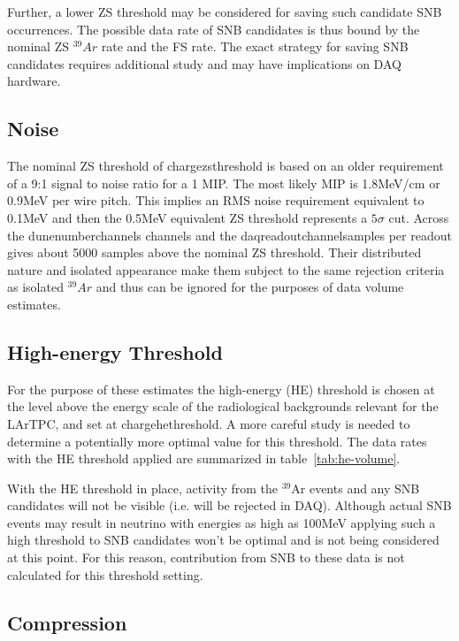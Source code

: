 Further, a lower ZS threshold may be considered for saving such
candidate SNB occurrences.
The possible data rate of SNB candidates is thus bound by the nominal
ZS $^{39}Ar$ rate and the FS rate.
The exact strategy for saving SNB candidates requires additional study
and may have implications on DAQ hardware.

\subsection{Noise}

The nominal ZS threshold of chargezsthreshold is based on an older
requirement of a 9:1 signal to noise ratio for a 1 MIP.
The most likely MIP is 1.8MeV/cm or 0.9MeV per wire pitch.
This implies an RMS noise requirement equivalent to 0.1MeV and
then the 0.5MeV equivalent ZS threshold represents a $5\sigma$ cut.
Across the dunenumberchannels channels and the
daqreadoutchannelsamples per readout gives about 5000 samples
above the nominal ZS threshold.
Their distributed nature and isolated appearance make them subject to
the same rejection criteria as isolated $^{39}Ar$ and thus can be
ignored for the purposes of data volume estimates.


\subsection{High-energy Threshold}

For the purpose of these estimates the  high-energy (HE) threshold is chosen at the level above 
the energy scale of the radiological backgrounds relevant for the LArTPC, and set at  chargehethreshold.
A more careful study is needed to determine a potentially more optimal value for this threshold.
The data rates with the HE threshold applied are summarized in table~\ref{tab:he-volume}.

%

With the HE threshold in place, activity from the $^{39}$Ar events and any SNB
candidates will not be visible (i.e. will be rejected in DAQ).
Although actual SNB events may result in neutrino with energies as high as
100MeV applying such a high threshold to SNB candidates won't be optimal and is not being considered at this point.
For this reason, contribution from SNB to these data is not calculated for this threshold setting.


\subsection{Compression}


